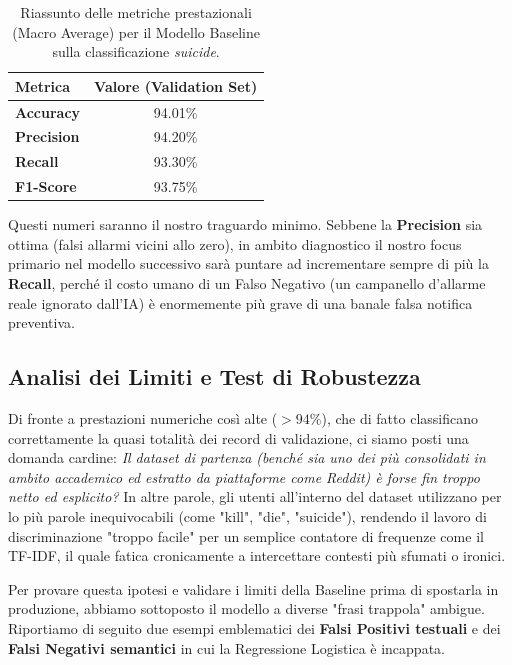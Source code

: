 \begin{table}[htbp]
    \centering
    \renewcommand{\arraystretch}{1.3}
    \begin{tabular}{|l|c|}
        \hline
        \textbf{Metrica}   & \textbf{Valore (Validation Set)} \\
        \hline
        \hline
        \textbf{Accuracy}  & 94.01\%                          \\
        \textbf{Precision} & 94.20\%                          \\
        \textbf{Recall}    & 93.30\%                          \\
        \textbf{F1-Score}  & 93.75\%                          \\
        \hline
    \end{tabular}
    \caption{Riassunto delle metriche prestazionali (Macro Average) per il Modello Baseline sulla classificazione \textit{suicide}.}
    \label{tab:nlp_baseline_metrics}
\end{table}

Questi numeri saranno il nostro traguardo minimo. Sebbene la \textbf{Precision} sia ottima (falsi allarmi vicini allo zero), in ambito diagnostico il nostro focus primario nel modello successivo sarà puntare ad incrementare sempre di più la \textbf{Recall}, perché il costo umano di un Falso Negativo (un campanello d'allarme reale ignorato dall'IA) è enormemente più grave di una banale falsa notifica preventiva.

\subsection{Analisi dei Limiti e Test di Robustezza}
Di fronte a prestazioni numeriche così alte ($>94\%$), che di fatto classificano correttamente la quasi totalità dei record di validazione, ci siamo posti una domanda cardine: \textit{Il dataset di partenza (benché sia uno dei più consolidati in ambito accademico ed estratto da piattaforme come Reddit) è forse fin troppo netto ed esplicito?}
In altre parole, gli utenti all'interno del dataset utilizzano per lo più parole inequivocabili (come "kill", "die", "suicide"), rendendo il lavoro di discriminazione "troppo facile" per un semplice contatore di frequenze come il TF-IDF, il quale fatica cronicamente a intercettare contesti più sfumati o ironici.

Per provare questa ipotesi e validare i limiti della Baseline prima di spostarla in produzione, abbiamo sottoposto il modello a diverse "frasi trappola" ambigue. Riportiamo di seguito due esempi emblematici dei \textbf{Falsi Positivi testuali} e dei \textbf{Falsi Negativi semantici} in cui la Regressione Logistica è incappata.


